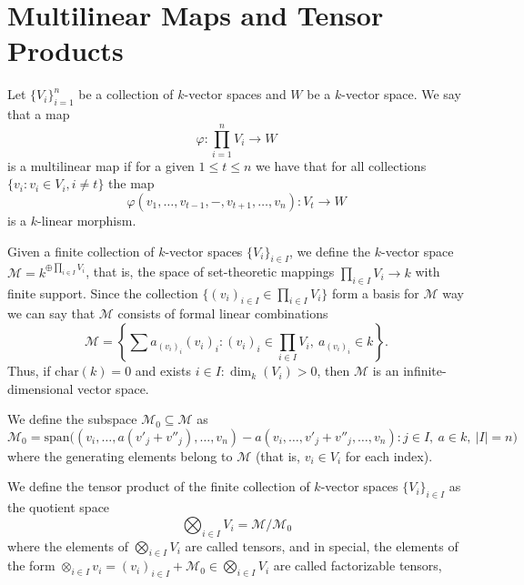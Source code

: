 
\section{Multilinear Maps and Tensor Products}

\begin{definition}\label{def: multilinear map}
  Let \(\{V_i\}_{i=1}^n\) be a collection of \(k\)-vector spaces and \(W\) be a
  \(k\)-vector space. We say that a map
  \[
    \varphi: \prod_{i=1}^n V_i \to W
  \]
  is a multilinear map if for a given \(1 \leq t \leq n\) we have that for all
  collections \(\{v_i : v_i \in V_i, i \neq t\}\) the map
  \[
    \varphi(v_1, \dots, v_{t-1}, -, v_{t+1}, \dots, v_n): V_t \to W
  \]
  is a \(k\)-linear morphism.
\end{definition}

\begin{definition}\label{def: space M}
  Given a finite collection of \(k\)-vector spaces \(\{V_i\}_{i \in I}\), we
  define the \(k\)-vector space \(\mathcal M = k^{\oplus \prod_{i \in I} V_i}\),
  that is, the space of set-theoretic mappings \(\prod_{i \in I} V_i \to k\)
  with finite support. Since the collection \(\{(v_i)_{i \in I} \in \prod_{i \in
  I} V_i\}\) form a basis for \(\mathcal M\) way we can say that \(\mathcal M\)
  consists of formal linear combinations
  \[
    \mathcal M =
    \left\{
      \sum a_{(v_i)_i} (v_i)_i :
      (v_i)_i \in \prod_{i \in I} V_i,\
      a_{(v_i)_i} \in k
    \right\}.
  \]
  Thus, if \(\mathrm{char}(k) = 0\) and exists \(i \in I : \dim_k(V_i) > 0\),
  then \(\mathcal M\) is an infinite-dimensional vector space.
\end{definition}

\begin{definition}\label{def: subspace M_0}
  We define the subspace \(\mathcal M_0 \subseteq \mathcal M\) as
  \[
    \mathcal M_0 = \mathrm{span}
    \big(
      (v_i, \dots, a(v'_j + v''_j), \dots, v_n) - a(v_i, \dots, v'_j +
      v''_j, \dots, v_n) : j \in I,\ a \in k,\ |I| = n
    \big)
  \]
  where the generating elements belong to \(\mathcal M\) (that is, \(v_i \in
  V_i\) for each index).
\end{definition}

\begin{definition}\label{def: tensor product}
  We define the tensor product of the finite collection of \(k\)-vector spaces
  \(\{V_i\}_{i \in I}\) as the quotient space
  \[
    \bigotimes_{i \in I} V_i = \mathcal M / \mathcal M_0
  \]
  where the elements of \(\bigotimes_{i \in I} V_i\) are called tensors, and in
  special, the elements of the form \(\otimes_{i \in I} v_i = (v_i)_{i \in I}
  + \mathcal M_0 \in \bigotimes_{i \in I} V_i\) are called factorizable tensors,
\end{definition}

